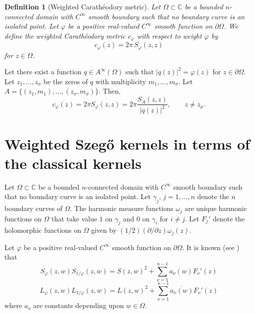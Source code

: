 \documentclass[11pt, reqno]{amsart}
\newtheorem{defn}[thm]{Definition}
\numberwithin{equation}{section}
\newcommand{\Om}{\Omega}
\begin{document}
	\begin{defn}[Weighted Carathéodory metric]
		Let $\Omega\subset\mathbb{C}$ be a bounded $n$-connected domain with $C^{\infty}$ smooth boundary such that no boundary curve is an isolated point. Let $\varphi$ be a positive real-valued $C^{\infty}$ smooth function on $\partial\Om$. We define the weighted Carathéodory metric $c_{\varphi}$ with respect to weight $\varphi$ by
		\begin{equation}
		c_{\varphi}(z) = 2\pi\, S_{\varphi}(z,z)
		\end{equation}
		for $z\in\Om$.
	\end{defn}
	
	Let there exist a function $q\in A^{\infty}(\Om)$ such that $\vert q(z)\vert^2 = \varphi(z)$ for $z\in\partial\Om$. Let $z_1,\ldots,z_{\sigma}$ be the zeros of $q$ with multiplicity $m_1,\ldots,m_{\sigma}$. Let $A=\{(z_1,m_1),\ldots,(z_{\sigma},m_{\sigma})\}$. Then,
	\begin{equation}
	c_{\varphi}(z) = 2\pi S_{\varphi}(z,z) = 2\pi \frac{S_A(z,z)}{\vert q(z)\vert^2},\quad\quad z\neq z_{\mu}.
	\end{equation}

	\section{Weighted Szeg\H{o} kernels in terms of the classical kernels}
	
	Let $\Omega\subset\mathbb{C}$ be a bounded $n$-connected domain with $C^{\infty}$ smooth boundary such that no boundary curve is an isolated point. Let $\gamma_j$, $j=1,\ldots,n$ denote the $n$ boundary curves of $\Omega$. The harmonic measure functions $\omega_j$ are unique harmonic functions on $\Omega$ that take value $1$ on $\gamma_j$ and $0$ on $\gamma_i$ for $i\neq j$. Let $F_j'$ denote the holomorphic functions on $\Omega$ given by $(1/2)(\partial/\partial z)\omega_j(z)$.
	
	\medskip
	
	Let $\varphi$ be a positive real-valued $C^{\infty}$ smooth function on $\partial\Om$. It is known (see \cite{Nehari_1}) that 
	\begin{equation}\label{1}
	S_{\varphi}(z,w) S_{1/\varphi}(z,w) = S(z,w)^2 + \sum_{\nu=1}^{n-1} a_{\nu}(w)F_{\nu}'(z)
	\end{equation}
	\begin{equation}\label{2}
	L_{\varphi}(z,w) L_{1/\varphi}(z,w) = L(z,w)^2 + \sum_{\nu=1}^{n-1} \overline{a_{\nu}(w)}F_{\nu}'(z) 
	\end{equation}
	where $a_{\nu}$ are constants depending upon $w\in\Om$.
	
\end{document}
